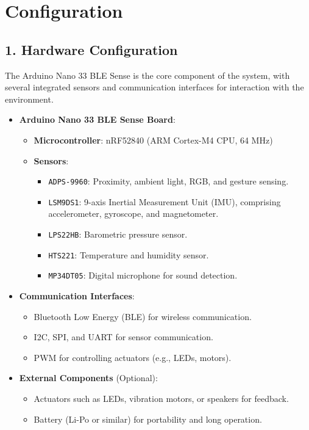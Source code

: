 \section{Configuration}

	\subsection*{1. Hardware Configuration}
	
	The Arduino Nano 33 BLE Sense is the core component of the system, with several integrated sensors and communication interfaces for interaction with the environment.
	
	\begin{itemize}
		\item \textbf{Arduino Nano 33 BLE Sense Board}:
		\begin{itemize}
			\item \textbf{Microcontroller}: nRF52840 (ARM Cortex-M4 CPU, 64 MHz)
			\item \textbf{Sensors}:
			\begin{itemize}
				\item \texttt{ADPS-9960}: Proximity, ambient light, RGB, and gesture sensing.
				\item \texttt{LSM9DS1}: 9-axis Inertial Measurement Unit (IMU), comprising accelerometer, gyroscope, and magnetometer.
				\item \texttt{LPS22HB}: Barometric pressure sensor.
				\item \texttt{HTS221}: Temperature and humidity sensor.
				\item \texttt{MP34DT05}: Digital microphone for sound detection.
			\end{itemize}
		\end{itemize}
		\item \textbf{Communication Interfaces}:
		\begin{itemize}
			\item Bluetooth Low Energy (BLE) for wireless communication.
			\item I2C, SPI, and UART for sensor communication.
			\item PWM for controlling actuators (e.g., LEDs, motors).
		\end{itemize}
		\item \textbf{External Components} (Optional):
		\begin{itemize}
			\item Actuators such as LEDs, vibration motors, or speakers for feedback.
			\item Battery (Li-Po or similar) for portability and long operation.
		\end{itemize}
	\end{itemize}
	
